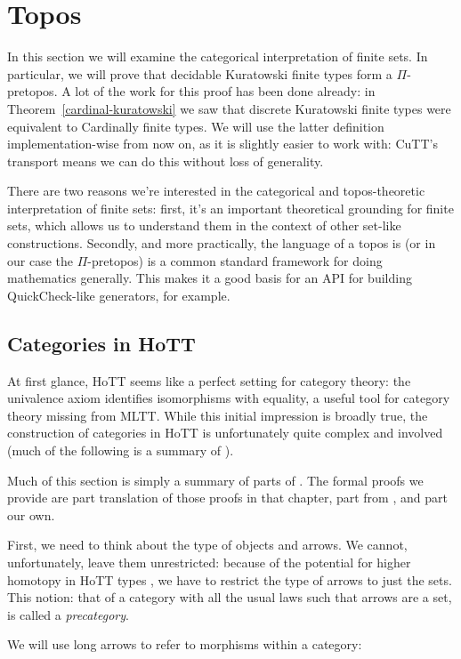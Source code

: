 \chapter{Topos} \label{topos}
In this section we will examine the categorical interpretation of finite sets.
In particular, we will prove that decidable Kuratowski finite types form a
\(\Pi\)-pretopos.
A lot of the work for this proof has been done already: in
Theorem~\ref{cardinal-kuratowski} we saw that discrete Kuratowski finite types
were equivalent to Cardinally finite types.
We will use the latter definition implementation-wise from now on, as it is
slightly easier to work with: CuTT's transport means we can do this without loss
of generality.

There are two reasons we're interested in the categorical and topos-theoretic
interpretation of finite sets: first, it's an important theoretical grounding
for finite sets, which allows us to understand them in the context of other
set-like constructions.
Secondly, and more practically, the language of a topos is (or in our case the
\(\Pi\)-pretopos) is a common standard framework for doing mathematics
generally.
This makes it a good basis for an API for building QuickCheck-like generators,
for example.
\section{Categories in HoTT}
At first glance, HoTT seems like a perfect setting for category theory: the
univalence axiom identifies isomorphisms with equality, a useful tool for
category theory missing from MLTT.
While this initial impression is broadly true, the construction of categories in
HoTT is unfortunately quite complex and involved (much of the following is a
summary of \citet[chapter 9]{hottbook}).

Much of this section is simply a summary of parts of \citet[chapter
9]{hottbook}.
The formal proofs we provide are part translation of those proofs in that
chapter, part from \cite{iversenFredefoxCat2018}
\cite{huProofrelevantCategoryTheory2020}, and part our own.

First, we need to think about the type of objects and arrows.
We cannot, unfortunately, leave them unrestricted: because of the potential for
higher homotopy in HoTT types , we have
to restrict the type of arrows to just the sets.
This notion: that of a category with all the usual laws such that arrows are a
set, is called a \emph{precategory}.
\begin{agdalisting}
\end{agdalisting}
We will use long arrows to refer to morphisms within a category:
\begin{agdalisting}
\end{agdalisting}

